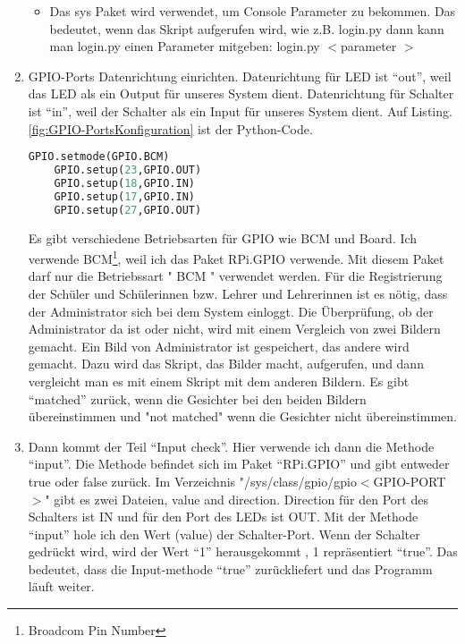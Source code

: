 \begin{enumerate}
\begin{itemize}
	 \item Das sys Paket wird verwendet, um Console Parameter zu bekommen. Das bedeutet, wenn das Skript aufgerufen wird, wie z.B. login.py dann kann man login.py einen Parameter mitgeben:  login.py $<$parameter $>$ \\ 
   \end{itemize}
	\item GPIO-Ports Datenrichtung einrichten. Datenrichtung f\"ur LED ist ``out'', weil das LED als ein Output f\"ur unseres System dient. Datenrichtung f\"ur Schalter ist ``in'', weil der Schalter als ein Input f\"ur unseres System dient. Auf Listing. \ref{fig:GPIO-PortsKonfiguration} ist der Python-Code.
	\begin{lstlisting}[caption={GPIO-Ports Konfiguration},label={fig:GPIO-PortsKonfiguration},language=Python]
	GPIO.setmode(GPIO.BCM)
	GPIO.setup(23,GPIO.OUT)
	GPIO.setup(18,GPIO.IN)
	GPIO.setup(17,GPIO.IN)
	GPIO.setup(27,GPIO.OUT)
	\end{lstlisting}
	Es gibt verschiedene Betriebsarten f\"ur GPIO wie BCM und Board.
	Ich verwende BCM\footnote{Broadcom Pin Number}, weil ich das Paket RPi.GPIO verwende. Mit diesem Paket darf nur die Betriebssart " BCM " verwendet werden. 
	\cite{gpiomode}
	F\"ur die Registrierung der Sch\"uler und Sch\"ulerinnen bzw. Lehrer und Lehrerinnen ist es n\"otig, dass der Administrator sich bei dem System einloggt. Die \"Uberpr\"ufung, ob der Administrator da ist oder nicht,  wird mit einem Vergleich von zwei Bildern gemacht. Ein Bild von Administrator ist gespeichert, das andere wird gemacht. Dazu wird das Skript, das Bilder macht, aufgerufen, und dann vergleicht man es mit einem Skript mit dem anderen Bildern. Es gibt ``matched'' zur\"uck, wenn die Gesichter bei den beiden Bildern \"ubereinstimmen und "not matched" wenn die Gesichter nicht \"ubereinstimmen.
	\item Dann kommt der Teil ``Input check''. 
	Hier verwende ich dann die Methode ``input''. Die Methode befindet sich im Paket ``RPi.GPIO'' und gibt entweder true oder false zur\"uck. 
	Im Verzeichnis "/sys/class/gpio/gpio$<$GPIO-PORT$>$" gibt es zwei Dateien, value and direction. Direction f\"ur den Port des Schalters ist IN und f\"ur den Port des LEDs ist OUT. Mit der Methode ``input'' hole ich den Wert (value) der Schalter-Port. Wenn der Schalter gedr\"uckt wird, wird der Wert ``1'' herausgekommt , 1 repr\"asentiert ``true''. Das bedeutet, dass die Input-methode ``true'' zur\"uckliefert und das Programm l\"auft weiter.
	

\end{enumerate}

